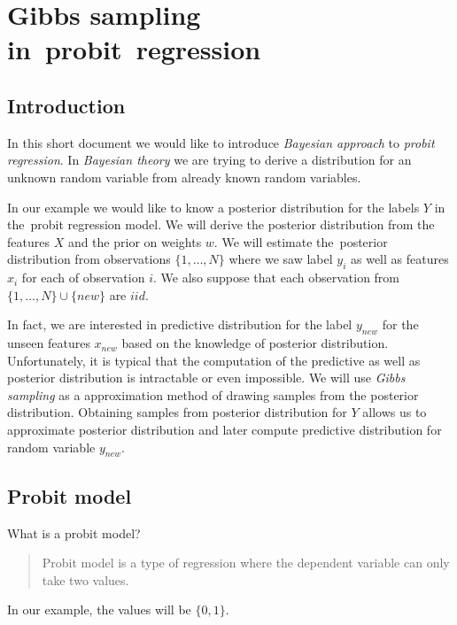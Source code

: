 

\chapter{Gibbs sampling in~probit~regression}
\label{cha:gibbs_sampling_for_probit_regression}


\section{Introduction} 
\label{sec:introduction}
In this short document we would like to introduce {\it Bayesian approach} to {\it probit regression}. In {\it Bayesian theory} we are  trying to derive a distribution for an unknown random variable from already known random variables. 

In our example we would like to know a posterior distribution for the labels $Y$ in the~probit regression model. We will derive the posterior distribution from the features $X$ and the prior on weights $w$. We will estimate the~posterior distribution from observations $\{1,\ldots,N\}$ where we saw label $y_i$ as well as features $x_i$ for each of observation $i$. We also suppose that each observation from $\{1,\ldots,N\} \cup \{new\}$ are $iid$. 

In fact, we are interested in predictive distribution for the label $y_{new}$ for the unseen features $x_{new}$ based on the knowledge of posterior distribution. Unfortunately, it is typical that the computation of the predictive as well as posterior distribution is intractable or even impossible. We will use {\it Gibbs sampling} as a approximation method of drawing samples from the posterior distribution. Obtaining samples from posterior distribution for $Y$ allows us to approximate posterior distribution and later compute predictive distribution for random variable $y_{new}$.



\section{Probit model}
What is a probit model?
\begin{quotation}
    Probit model is a type of regression where the dependent variable can only take two values.
\end{quotation}\cite{wiki_probit}
In our example, the values will be $\{0,1\}$.

